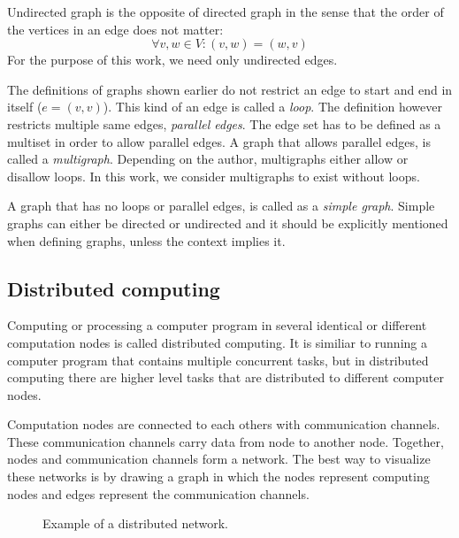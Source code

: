 
Undirected graph is the opposite of directed graph in the sense that the order of the vertices in an edge does not matter:
\begin{equation}
\forall v, w \in V: (v, w) = (w, v)
\end{equation}
For the purpose of this work, we need only undirected edges.

The definitions of graphs shown earlier do not restrict an edge to start and end in itself ($e=(v, v)$).
This kind of an edge is called a \emph{loop}.
The definition however restricts multiple same edges, \emph{parallel edges}.
The edge set has to be defined as a multiset in order to allow parallel edges.
A graph that allows parallel edges, is called a \emph{multigraph}.
Depending on the author, multigraphs either allow or disallow loops.
In this work, we consider multigraphs to exist without loops.

A graph that has no loops or parallel edges, is called as a \emph{simple graph}.
Simple graphs can either be directed or undirected and it should be explicitly mentioned when defining graphs, unless the context implies it.






\subsection{Distributed computing} \label{sec:distributed_computing}
Computing or processing a computer program in several identical or different computation nodes is called distributed computing.
It is similiar to running a computer program that contains multiple concurrent tasks, but in distributed computing there are higher level tasks that are distributed to different computer nodes.

Computation nodes are connected to each others with communication channels.
These communication channels carry data from node to another node.
Together, nodes and communication channels form a network.
The best way to visualize these networks is by drawing a graph in which the nodes represent computing nodes and edges represent the communication channels.

\begin{figure}[h]
  \centering
\caption{Example of a distributed network.}
\label{fig:graph1}
\end{figure}

